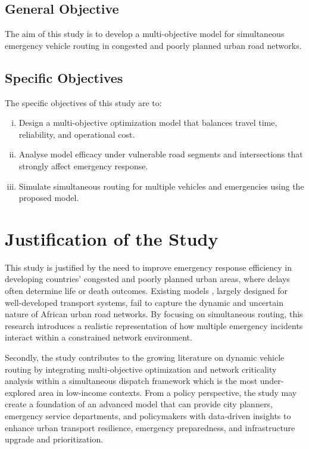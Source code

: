 \documentclass[paper=A4, 12pt, mathscr]{report}
\begin{document}
	\subsection{General Objective}
	The aim of this study is to develop a multi-objective model for simultaneous emergency vehicle routing in congested and poorly planned urban road networks.
	
	\subsection{Specific Objectives}
	The specific objectives of this study are to:
	\begin{enumerate}[(i)]
		\item Design a multi-objective optimization model that balances travel time, reliability, and operational cost.
		\item Analyse model efficacy under vulnerable road segments and intersections that strongly affect emergency response.
		\item Simulate simultaneous routing for multiple vehicles and emergencies using the proposed model.
	\end{enumerate}
	
	\section{Justification of the Study}
	
	This study is justified by the need to improve emergency response efficiency in developing countries' congested and poorly planned urban areas, where delays often determine life or death outcomes. Existing models \cite{10,tirkolaee2020,yan2021,ding2021}, largely designed for well-developed transport systems, fail to capture the dynamic and uncertain nature of African urban road networks. By focusing on simultaneous routing, this research introduces a realistic representation of how multiple emergency incidents interact within a constrained network environment.
	
	Secondly, the study contributes to the growing literature on dynamic vehicle routing by integrating multi-objective optimization and network criticality analysis within a simultaneous dispatch framework which is the most under-explored area in low-income contexts. From a policy perspective, the study may create a foundation of an advanced model that can provide city planners, emergency service departments, and policymakers with data-driven insights to enhance urban transport resilience, emergency preparedness, and infrastructure upgrade and prioritization.
	
\end{document}
